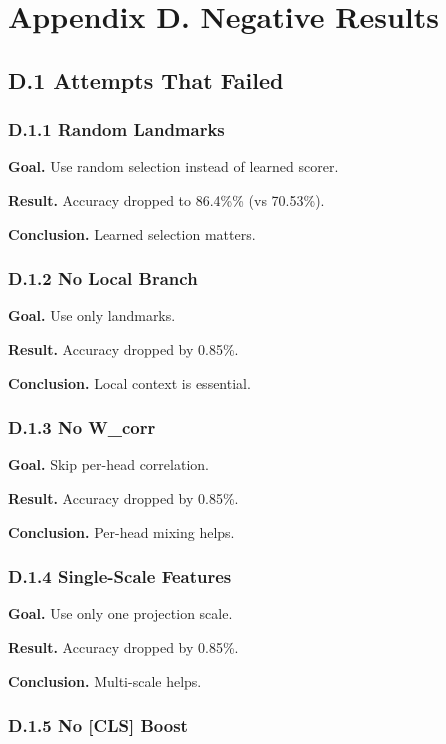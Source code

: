\section{Appendix D. Negative Results}

\subsection{D.1 Attempts That Failed}

\subsubsection{D.1.1 Random Landmarks}

\textbf{Goal.} Use random selection instead of learned scorer.

\textbf{Result.} Accuracy dropped to 86.4\%\% (vs 70.53\%).

\textbf{Conclusion.} Learned selection matters.

\subsubsection{D.1.2 No Local Branch}

\textbf{Goal.} Use only landmarks.

\textbf{Result.} Accuracy dropped by 0.85\%.

\textbf{Conclusion.} Local context is essential.

\subsubsection{D.1.3 No W\_corr}

\textbf{Goal.} Skip per-head correlation.

\textbf{Result.} Accuracy dropped by 0.85\%.

\textbf{Conclusion.} Per-head mixing helps.

\subsubsection{D.1.4 Single-Scale Features}

\textbf{Goal.} Use only one projection scale.

\textbf{Result.} Accuracy dropped by 0.85\%.

\textbf{Conclusion.} Multi-scale helps.

\subsubsection{D.1.5 No [CLS] Boost}

